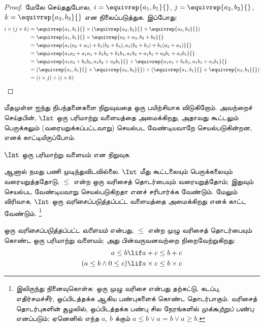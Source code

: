 \documentclass[../../../include/open-logic-section]{subfiles}
\begin{document}
\begin{proof}
மேலே செய்ததுபோல, $i = \equivrep{a_1, b_1}{}$, $j =
\equivrep{a_2,b_2}{}$, $k = \equivrep{a_3, b_3}{}$ என
நிலைப்படுத்துக. இப்போது:
\begin{align*}
	i \times (j + k)
	&= \equivrep{a_1, b_1}{} \times (\equivrep{a_2,b_2}{} + \equivrep{a_3, b_3}{})\\
	&= \equivrep{a_1, b_1}{} \times \equivrep{a_2 + a_3,b_2+b_3}{}\\
	&= \equivrep{a_1  (a_2 + a_3) + b_1  (b_2+b_3), a_1  (b_2 + b_3) + b_1 (a_2 + a_3)}{}\\
	&= \equivrep{a_1 a_2 + a_1a_3 + b_1 b_2+b_1b_3, a_1 b_2 + a_1b_3 + a_2b_1 + a_3b_1}{}\\		
	&= \equivrep{a_1a_2 + b_1b_2, a_1b_2 + a_2b_1}{} + \equivrep{a_1a_3 + b_1b_3, a_1b_3 + a_3b_1}{}\\
	&= (\equivrep{a_1, b_1}{} \times \equivrep{a_2,b_2}{}) + (\equivrep{a_1, b_1}{} \times  \equivrep{a_3, b_3}{})\\
	&= (i \times j) + (i \times k)
\end{align*}
\end{proof}

மீதமுள்ள ஐந்து நிபந்தனைகளை நிறுவுவதை ஒரு பயிற்சியாக விடுகிறோம்.
அவற்றைச் செய்தபின், $\Int$ ஒரு பரிமாற்று வளையத்தை அமைக்கிறது,
அதாவது கூட்டலும் பெருக்கலும் (வரையறுக்கப்பட்டவாறு)
செயல்பட வேண்டியவாறே செயல்படுகின்றன, எனக் காட்டியிருப்போம்.

\begin{prob}
$\Int$ ஒரு பரிமாற்று வளையம் என நிறுவுக.
\end{prob}

ஆனால் நமது பணி முடிந்துவிடவில்லை.
$\Int$ மீது கூட்டலையும் பெருக்கலையும் வரையறுத்ததோடு,
$\leq$ என்ற ஒரு வரிசைத் தொடர்பையும் வரையறுத்தோம்;
இதுவும் செயல்பட வேண்டியவாறு செயல்படுகிறதா எனச் சரிபார்க்க வேண்டும்.
மேலும் விரிவாக, $\Int$ ஒரு \emph{வரிசைப்படுத்தப்பட்ட} வளையத்தை
அமைக்கிறது எனக் காட்ட வேண்டும்.
\footnote{ இலிருந்து நினைவுகொள்க:
	ஒரு முழு வரிசை என்பது தற்சுட்டு, கடப்பு, எதிர்சமச்சீர்,
    ஒப்பிடத்தக்க ஆகிய பண்புகளைக் கொண்ட தொடர்பாகும்.
	வரிசைத் தொடர்புகளின் சூழலில், ஒப்பிடத்தக்க பண்பு சில நேரங்களில்
	\emph{முக்கூற்றுப் பண்பு} எனப்படும்; ஏனெனில் எந்த $a$, $b$ க்கும்
    $a \leq b \lor a = b \lor a \geq b$.}

\begin{defn}
ஒரு \emph{வரிசைப்படுத்தப்பட்ட வளையம்} என்பது,
$\leq$ என்ற முழு வரிசைத் தொடர்பையும் கொண்ட ஒரு பரிமாற்று வளையம்;
அது பின்வருவனவற்றை நிறைவேற்றுகிறது:
\begin{align*}
	a \leq b &\lif a + c \leq b + c\\
	(a \leq b \land 0 \leq c) &\lif a \times c \leq b \times c
\end{align*}
\end{defn}
\end{document}

